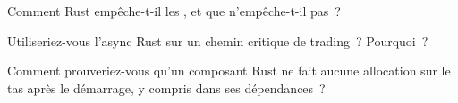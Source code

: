 \begin{interviewq}\label{iq:ll:rust-for-low-latency:4}
Comment Rust empêche-t-il les , et que n'empêche-t-il pas~?
\end{interviewq}

\begin{interviewq}\label{iq:ll:rust-for-low-latency:5}
Utiliseriez-vous l'async Rust sur un chemin critique de trading~? Pourquoi~?
\end{interviewq}

\begin{interviewq}\label{iq:ll:rust-for-low-latency:6}
Comment prouveriez-vous qu'un composant Rust ne fait aucune allocation sur le tas après le démarrage, y compris dans ses dépendances~?
\end{interviewq}
